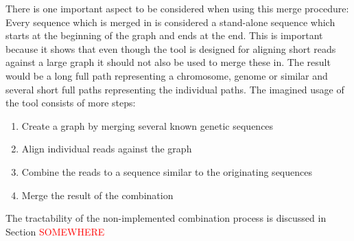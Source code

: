 \documentclass[thesis.tex]{subfiles}
\begin{document}
\par\noindent
There is one important aspect to be considered when using this merge procedure: Every sequence which is merged in is considered a stand-alone sequence which starts at the beginning of the graph and ends at the end. This is important because it shows that even though the tool is designed for aligning short reads against a large graph it should not also be used to merge these in. The result would be a long full path representing a chromosome, genome or similar and several short full paths representing the individual paths. The imagined usage of the tool consists of more steps:
\begin{enumerate}
  \item Create a graph by merging several known genetic sequences
  \item Align individual reads against the graph
  \item Combine the reads to a sequence similar to the originating sequences
  \item Merge the result of the combination
\end{enumerate}
The tractability of the non-implemented combination process is discussed in Section \textcolor{red}{SOMEWHERE}
\end{document}
